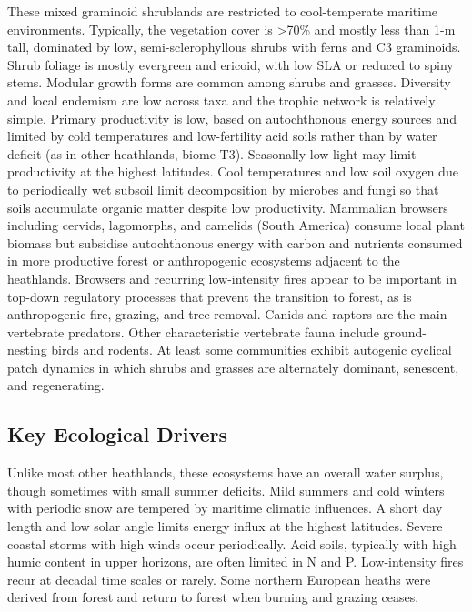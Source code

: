 \documentclass[
  letterpaper,
  DIV=11,
  numbers=noendperiod]{scrartcl}
\begin{document}
These mixed graminoid shrublands are restricted to cool-temperate
maritime environments. Typically, the vegetation cover is
\textgreater70\% and mostly less than 1-m tall, dominated by low,
semi-sclerophyllous shrubs with ferns and C3 graminoids. Shrub foliage
is mostly evergreen and ericoid, with low SLA or reduced to spiny stems.
Modular growth forms are common among shrubs and grasses. Diversity and
local endemism are low across taxa and the trophic network is relatively
simple. Primary productivity is low, based on autochthonous energy
sources and limited by cold temperatures and low-fertility acid soils
rather than by water deficit (as in other heathlands, biome T3).
Seasonally low light may limit productivity at the highest latitudes.
Cool temperatures and low soil oxygen due to periodically wet subsoil
limit decomposition by microbes and fungi so that soils accumulate
organic matter despite low productivity. Mammalian browsers including
cervids, lagomorphs, and camelids (South America) consume local plant
biomass but subsidise autochthonous energy with carbon and nutrients
consumed in more productive forest or anthropogenic ecosystems adjacent
to the heathlands. Browsers and recurring low-intensity fires appear to
be important in top-down regulatory processes that prevent the
transition to forest, as is anthropogenic fire, grazing, and tree
removal. Canids and raptors are the main vertebrate predators. Other
characteristic vertebrate fauna include ground-nesting birds and
rodents. At least some communities exhibit autogenic cyclical patch
dynamics in which shrubs and grasses are alternately dominant,
senescent, and regenerating.

\subsection{Key Ecological Drivers}\label{key-ecological-drivers-81}

Unlike most other heathlands, these ecosystems have an overall water
surplus, though sometimes with small summer deficits. Mild summers and
cold winters with periodic snow are tempered by maritime climatic
influences. A short day length and low solar angle limits energy influx
at the highest latitudes. Severe coastal storms with high winds occur
periodically. Acid soils, typically with high humic content in upper
horizons, are often limited in N and P. Low-intensity fires recur at
decadal time scales or rarely. Some northern European heaths were
derived from forest and return to forest when burning and grazing
ceases.
\end{document}
